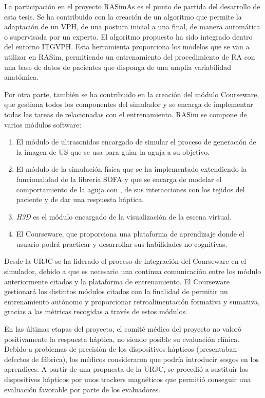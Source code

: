 La participación en el proyecto \ac{RASimAs} es el punto de partida del desarrollo de esta tesis. Se ha contribuido con la creación de un algoritmo que permite la adaptación de un \ac{VPH}, de una postura inicial a una final, de manera automática o supervisada por un experto.
El algoritmo propuesto ha sido integrado dentro del entorno \ac{ITGVPH}.
Esta herramienta proporciona los modelos que se van a utilizar en \ac{RASim}, permitiendo un entrenamiento del procedimiento de \ac{RA} con una base de datos de pacientes que disponga de una amplia variabilidad anatómica.

Por otra parte, también se ha contribuido en la creación del módulo \ac{Courseware}, que gestiona todos los componentes del simulador y se encarga de implementar todas las tareas de relacionadas con el entrenamiento. \ac{RASim} se compone de varios módulos software:
\begin{enumerate}
    \item El módulo de ultrasonidos \cite{Law2015} encargado de simular el proceso de generación de la imagen de \ac{US} que se usa para guiar la aguja a su objetivo.
    \item El módulo de la simulación física que se ha implementado extendiendo la funcionalidad de la librería \ac{SOFA}\cite{sofaweb} y que se encarga de modelar el comportamiento de la aguja con \cite{needleinsertion}, de sus interacciones con los tejidos del paciente y de dar una respuesta háptica.
    \item \emph{H3D} \cite{sensegraphics2012open} es el módulo encargado de la visualización de la escena virtual.
    \item El \ac{Courseware}, que proporciona una plataforma de aprendizaje donde el usuario podrá practicar y desarrollar sus habilidades no cognitivas.
\end{enumerate}
Desde la \ac{URJC} se ha liderado el proceso de integración del \ac{Courseware} en el simulador, debido a que es necesario una continua comunicación entre los módulo anteriormente citados y la plataforma de entrenamiento. El \ac{Courseware} gestionará los distintos módulos citados con la finalidad de permitir un entrenamiento autónomo y proporcionar retroalimentación formativa y sumativa, gracias a las métricas recogidas a través de estos módulos.

En las últimas etapas del proyecto, el comité médico del proyecto no valoró positivamente la respuesta háptica, no siendo posible su evaluación clínica. Debido a problemas de precisión de los dispositivos hápticos (presentaban defectos de fábrica), los médicos consideraron que podría introducir sesgos en los aprendices. A partir de una propuesta de la \ac{URJC}, se procedió a sustituir los dispositivos hápticos por unos \acs{tracker}s magnéticos que permitió conseguir una evaluación favorable por parte de los evaluadores.


